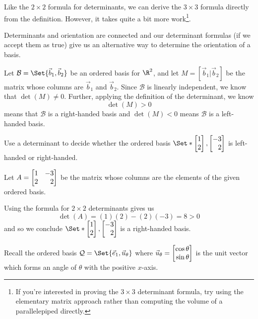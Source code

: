 Like the $2\times 2$ formula for determinants, we can derive the $3\times 3$ formula directly from the definition. However, it takes
quite a bit more work\footnote{ If you're interested in proving the $3\times 3$ determinant formula, try using the elementary matrix
approach rather than computing the volume of a parallelepiped directly.}.


Determinants and orientation are connected and our determinant formulas (if we accept them as true) give us an
alternative way to determine the orientation of a basis.

Let $\mathcal B=\Set{\vec b_1,\vec b_2}$ be an ordered basis for $\R^2$, and let $M=[\vec b_1|\vec b_2]$ be the matrix whose
columns are $\vec b_1$ and $\vec b_2$. Since $\mathcal B$ is linearly independent, we know that $\det(M)\neq 0$.
Further, applying the definition of the determinant, we know
\[
	\det(M)>0
\]
means that $\mathcal B$ is a right-handed basis and $\det(M)<0$ means $\mathcal B$ is a left-handed basis.

\begin{example}
	Use a determinant to decide whether the ordered basis $\Set*{\mat{1\\2},\mat{-3\\2}}$ is left-handed or right-handed.

	Let $A = \mat{1 & -3 \\ 2 & 2}$ be the matrix whose columns are the elements of the given ordered basis.
	
	Using the formula for $2 \times 2$ determinants gives us
	\[
		\det(A) = (1)(2) - (2)(-3) = 8 > 0
	\]
	and so we conclude $\Set*{\mat{1\\2},\mat{-3\\2}}$ is a right-handed basis.
\end{example}

\medskip
Recall the ordered basis $\mathcal Q=\Set{\xhat, \vec u_{\theta}}$ where $\vec u_\theta = \mat{\cos\theta\\\sin\theta}$ is the
unit vector which forms an angle of $\theta$ with the positive $x$-axis.

